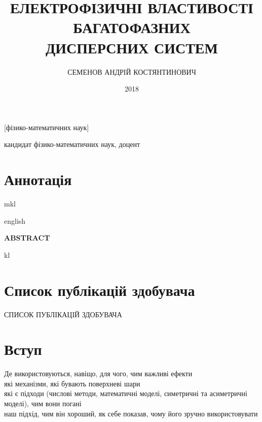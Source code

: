 \documentclass[12pt]{vakthesis}
\begin{document}

\author{СЕМЕНОВ АНДРІЙ КОСТЯНТИНОВИЧ}


\title{ЕЛЕКТРОФІЗИЧНІ ВЛАСТИВОСТІ БАГАТОФАЗНИХ\\
ДИСПЕРСНИХ СИСТЕМ}

[фізико-математичних наук]

           {кандидат фізико-математичних наук, доцент}

\date{2018}

\maketitle

\chapter*{Аннотація}
mkl

\begin{otherlanguage*}{english}
\begin{center}
    {\normalfont \textbf{ABSTRACT}}
\end{center}
\vskip 40pt

kl
\end{otherlanguage*}

\chapter*{Список публікацій здобувача}
\begin{bibset}[a]{СПИСОК ПУБЛІКАЦІЙ ЗДОБУВАЧА}


\end{bibset}

\tableofcontents

\chapter*{Вступ}
    Де використовуються, навіщо, для чого, чим важливі ефекти\\
    які механізми, які бувають поверхневі шари\\
    які є підходи (числові методи, математичні моделі, симетричні
    та асиметричні моделі), чим вони погані\\
    наш підхід, чим він хороший, як себе показав, чому його
    зручно використовувати\cite{VaZ75, PrB01umc,Pra98,Pie29} %
\end{document}
